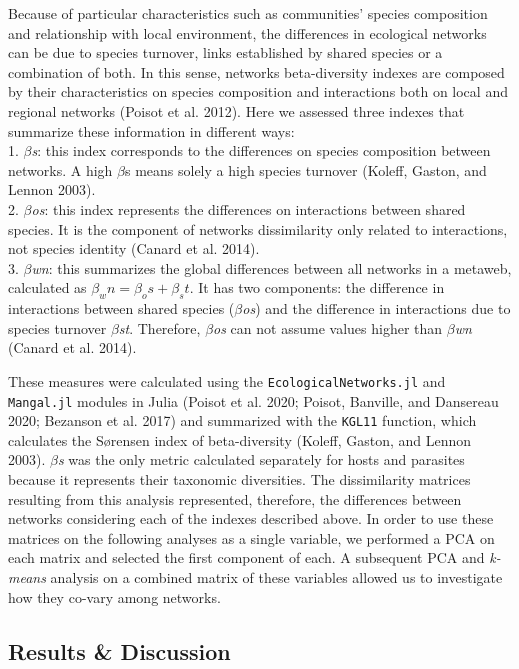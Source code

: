 \documentclass[11pt]{article}
\begin{document}
Because of particular characteristics such as communities' species
composition and relationship with local environment, the differences in
ecological networks can be due to species turnover, links established by
shared species or a combination of both. In this sense, networks
beta-diversity indexes are composed by their characteristics on species
composition and interactions both on local and regional networks (Poisot
et al. 2012). Here we assessed three indexes that summarize these
information in different ways:\\
1. \emph{\(\beta\)s}: this index corresponds to the differences on
species composition between networks. A high \(\beta\)s means solely a
high species turnover (Koleff, Gaston, and Lennon 2003).\\
2. \emph{\(\beta\)os}: this index represents the differences on
interactions between shared species. It is the component of networks
dissimilarity only related to interactions, not species identity (Canard
et al. 2014).\\
3. \emph{\(\beta\)wn}: this summarizes the global differences between
all networks in a metaweb, calculated as
\(\beta_wn = \beta_os + \beta_st\). It has two components: the
difference in interactions between shared species (\emph{\(\beta\)os})
and the difference in interactions due to species turnover
\emph{\(\beta\)st}. Therefore, \emph{\(\beta\)os} can not assume values
higher than \emph{\(\beta\)wn} (Canard et al. 2014).

These measures were calculated using the \texttt{EcologicalNetworks.jl}
and \texttt{Mangal.jl} modules in Julia (Poisot et al. 2020; Poisot,
Banville, and Dansereau 2020; Bezanson et al. 2017) and summarized with
the \texttt{KGL11} function, which calculates the Sørensen index of
beta-diversity (Koleff, Gaston, and Lennon 2003). \emph{\(\beta\)s} was
the only metric calculated separately for hosts and parasites because it
represents their taxonomic diversities. The dissimilarity matrices
resulting from this analysis represented, therefore, the differences
between networks considering each of the indexes described above. In
order to use these matrices on the following analyses as a single
variable, we performed a PCA on each matrix and selected the first
component of each. A subsequent PCA and \emph{k-means} analysis on a
combined matrix of these variables allowed us to investigate how they
co-vary among networks.

\hypertarget{results-discussion}{%
\subsection{Results \& Discussion}\label{results-discussion}}
\end{document}
